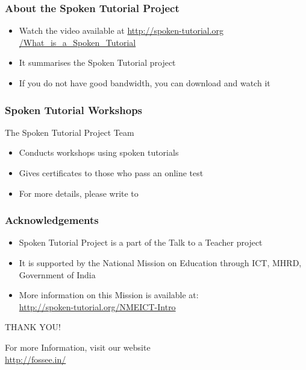 \documentclass[17pt,compress]{beamer}
\begin{document}
\begin{frame}
\frametitle{About the Spoken Tutorial Project}
\begin{itemize}
\item Watch the video available at {\color{blue}\url{http://spoken-tutorial.org /What\_is\_a\_Spoken\_Tutorial}} 
\item It summarises the Spoken Tutorial project 
\item If you do not have good bandwidth, you can download and watch it
\end{itemize}
\end{frame}

\begin{frame}
\frametitle{Spoken Tutorial Workshops}The Spoken Tutorial Project Team 
\begin{itemize}
\item Conducts workshops using spoken tutorials 
\item Gives certificates to those who pass an online test 
\item For more details, please write to \\ 
\end{itemize}
\end{frame}

\begin{frame}
\frametitle{Acknowledgements}
\begin{itemize}
\item Spoken Tutorial Project is a part of the Talk to a Teacher  project 
\item It is supported by the National Mission on Education through  ICT, MHRD, Government of India 
\item More information on this Mission is available at: \\{\color{blue}\url{http://spoken-tutorial.org/NMEICT-Intro}}
\end{itemize}
\end{frame}

\begin{frame}
  \begin{block}{}
  \begin{center}
  {\Large THANK YOU!} 
  \end{center}
  \end{block}
\begin{block}{}
  \begin{center}
    For more Information, visit our website\\
    {\color{blue}\url{http://fossee.in/}}
  \end{center}  
  \end{block}
\end{frame}
\end{document}

